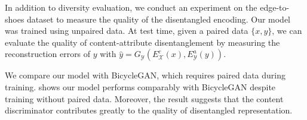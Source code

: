 \documentclass[runningheads]{llncs}
\begin{document}
\vspace{\paramargin}
In addition to diversity evaluation, we conduct an experiment on the edge-to-shoes dataset to measure the quality of the disentangled encoding.
%
Our model was trained using unpaired data.
At test time, given a paired data $\{x,y\}$, we can evaluate the quality of content-attribute disentanglement by measuring the reconstruction errors of $y$ with $\hat{y} = G_\mathcal{Y}(E_\mathcal{X}^c(x), E_\mathcal{Y}^a(y))$.

%
We compare our model with BicycleGAN, which requires paired data during training.
%
 shows our model performs comparably with BicycleGAN despite training without paired data.
%
Moreover, the result suggests that the content discriminator contributes greatly to the quality of disentangled representation.
\vspace{-1mm}
\end{document}
